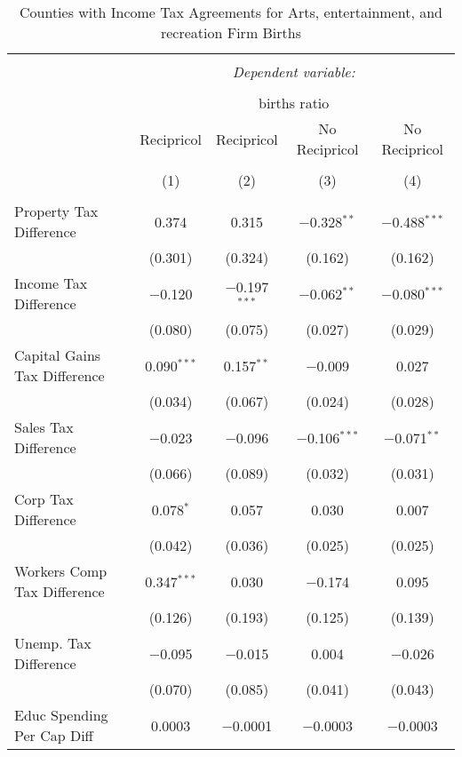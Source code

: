 
\begin{table}[!htbp] \centering 
  \caption{Counties with Income Tax Agreements for  Arts, entertainment, and recreation Firm Births} 
  \label{71rd} 
\begin{tabular}{@{\extracolsep{5pt}}lcccc} 
\\[-1.8ex]\hline 
\hline \\[-1.8ex] 
 & \multicolumn{4}{c}{\textit{Dependent variable:}} \\ 
\cline{2-5} 
\\[-1.8ex] & \multicolumn{4}{c}{births ratio} \\ 
 & Recipricol & Recipricol & No Recipricol & No Recipricol \\ 
\\[-1.8ex] & (1) & (2) & (3) & (4)\\ 
\hline \\[-1.8ex] 
 Property Tax Difference & 0.374 & 0.315 & $-$0.328$^{**}$ & $-$0.488$^{***}$ \\ 
  & (0.301) & (0.324) & (0.162) & (0.162) \\ 
  Income Tax Difference & $-$0.120 & $-$0.197$^{***}$ & $-$0.062$^{**}$ & $-$0.080$^{***}$ \\ 
  & (0.080) & (0.075) & (0.027) & (0.029) \\ 
  Capital Gains Tax Difference & 0.090$^{***}$ & 0.157$^{**}$ & $-$0.009 & 0.027 \\ 
  & (0.034) & (0.067) & (0.024) & (0.028) \\ 
  Sales Tax Difference & $-$0.023 & $-$0.096 & $-$0.106$^{***}$ & $-$0.071$^{**}$ \\ 
  & (0.066) & (0.089) & (0.032) & (0.031) \\ 
  Corp Tax Difference & 0.078$^{*}$ & 0.057 & 0.030 & 0.007 \\ 
  & (0.042) & (0.036) & (0.025) & (0.025) \\ 
  Workers Comp Tax Difference & 0.347$^{***}$ & 0.030 & $-$0.174 & 0.095 \\ 
  & (0.126) & (0.193) & (0.125) & (0.139) \\ 
  Unemp. Tax Difference & $-$0.095 & $-$0.015 & 0.004 & $-$0.026 \\ 
  & (0.070) & (0.085) & (0.041) & (0.043) \\ 
  Educ Spending Per Cap Diff & 0.0003 & $-$0.0001 & $-$0.0003 & $-$0.0003 \\ 

\end{tabular}
\end{table}
